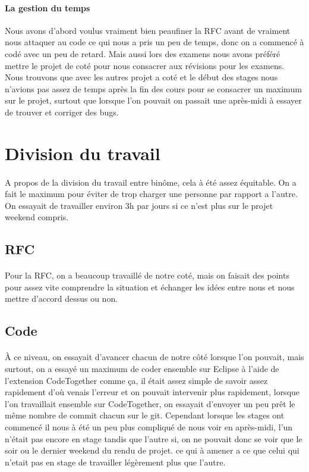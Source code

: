 \documentclass[a4paper,titlepage]{report}
\begin{document}
\paragraph{La gestion du temps}
Nous avons d'abord voulus vraiment bien peaufiner la RFC avant de vraiment nous attaquer au code ce qui nous a pris un peu de temps, donc on a commencé à codé avec un peu de retard.
Mais aussi lors des examens nous avons préféré mettre le projet de coté pour nous consacrer aux révisions pour les examens.
Nous trouvons que avec les autres projet a coté et le début des stages nous n'avions pas assez de temps après la fin des cours pour se consacrer un maximum sur le projet, surtout que lorsque l'on pouvait on passait une après-midi à essayer de trouver et corriger des bugs.



\pagebreak
\section{Division du travail}
\paragraph{}
A propos de la division du travail entre binôme, cela à été assez équitable. On a fait le maximum pour éviter de trop charger une personne par rapport a l'autre. On essayait de travailler environ 3h par jours si ce n'est plus sur le projet weekend compris.
\subsection{RFC}
\paragraph{}
Pour la RFC, on a beaucoup travaillé de notre coté, mais on faisait des points pour assez vite comprendre la situation et échanger les idées entre nous et nous mettre d'accord dessus ou non.
\subsection{Code}
\paragraph{}
À ce niveau, on essayait d'avancer chacun de notre côté lorsque l'on pouvait, mais surtout, on a essayé un maximum de coder ensemble sur Eclipse à l'aide de l'extension CodeTogether comme ça, il était assez simple de savoir assez rapidement d'où venais l'erreur et on pouvait intervenir plus rapidement, lorsque l'on travaillait ensemble sur CodeTogether, on essayait d'envoyer un peu prêt le même nombre de commit chacun sur le git. Cependant lorsque les stages ont commencé il nous à été un peu plus compliqué de nous voir en après-midi, l'un n'était pas encore en stage tandis que l'autre si, on ne pouvait donc se voir que le soir ou le dernier weekend du rendu de projet. ce qui à amener a ce que celui qui n'etait pas en stage de travailler légèrement plus que l'autre.
\end{document}
